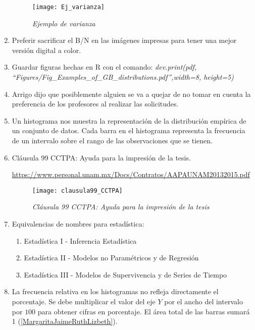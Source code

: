 \begin{appendices}
\begin{enumerate}
\begin{figure}[H]
\centering
\texttt{[image: Ej\_varianza]} %
\caption{\textit{Ejemplo de varianza}}
\end{figure}
  
  \item Preferir sacrificar el B/N en las imágenes impresas para tener una mejor versión digital a color.
  
  \item Guardar figuras hechas en R con el comando: \textit{dev.print(pdf, ``Figures/Fig\_Examples\_of\_GB\_distributions.pdf'',width=8, height=5)}
  
  \item Arrigo dijo que posiblemente alguien se va a quejar de no tomar en cuenta la preferencia de los profesores al realizar las solicitudes.
  
  \item Un histograma nos muestra la representación de la distribución empírica de un conjunto de datos. Cada barra en el histograma representa la frecuencia de un intervalo sobre el rango de las observaciones que se tienen.
  
  \item Cláusula 99 CCTPA: Ayuda para la impresión de la tesis.
  
  \url{https://www.personal.unam.mx/Docs/Contratos/AAPAUNAM20132015.pdf}

\begin{figure}[H]
\centering
\texttt{[image: clausula99\_CCTPA]} %
\caption{\textit{Cláusula 99 CCTPA: Ayuda para la impresión de la tesis}}
\end{figure}
  
  \item Equivalencias de nombres para estadística:
  \begin{enumerate}
  \item Estadística I - Inferencia Estadística
  
  \item Estadística II - Modelos no Paramétricos y de Regresión
  
  \item Estadística III - Modelos de Supervivencia y de Series de Tiempo
  \end{enumerate}
  
  \item La frecuencia relativa en los histogramas no refleja directamente el porcentaje. Se debe multiplicar el valor del eje $Y$ por el ancho del intervalo por $100$ para obtener cifras en porcentaje. El área total de las barras sumará 1 (\ref{MargaritaJaimeRuthLizbeth}).
  

\end{enumerate}
\end{appendices}
